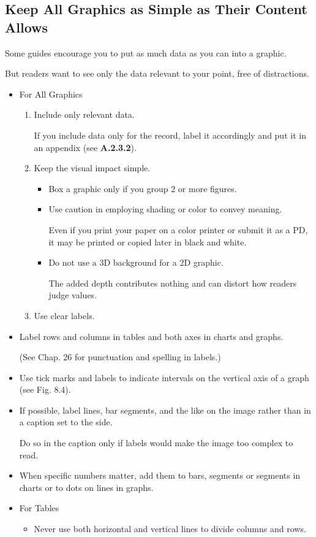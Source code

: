 \documentclass[oneside]{book}
\numberwithin{equation}{section}
\begin{document}
\subsection{Keep All Graphics as Simple as Their Content Allows}
Some guides encourage you to put as much data as you can into a graphic.

But readers want to see only the data relevant to your point, free of distractions.
\begin{itemize}
    \item For All Graphics
    \begin{enumerate}
        \item Include only relevant data.
        
        If you include data only for the record, label it accordingly and put it in an appendix (see \textbf{A.2.3.2}).
        \item Keep the visual impact simple.
        \begin{itemize}
            \item Box a graphic only if you group 2 or more figures.
            \item Use caution in employing shading or color to convey meaning.
            
            Even if you print your paper on a color printer or submit it as a PD, it may be printed or copied later in black and white.
            \item Do not use a 3D background for a 2D graphic.
            
            The added depth contributes nothing and can distort how readers judge values.
        \end{itemize}
        \item Use clear labels.
    \end{enumerate}
    \item Label rows and columns in tables and both axes in charts and graphs.
    
    (See Chap. 26 for punctuation and spelling in labels.)
    \item Use tick marks and labels to indicate intervals on the vertical axis of a graph (see Fig. 8.4).
    \item If possible, label lines, bar segments, and the like on the image rather than in a caption set to the side.
    
    Do so in the caption only if labels would make the image too complex to read.
    \item When specific numbers matter, add them to bars, segments or segments in charts or to dots on lines in graphs.
    \item For Tables
    \begin{itemize}
        \item Never use both horizontal and vertical lines to divide columns and rows.
        

\end{itemize}
\end{itemize}
\end{document}
